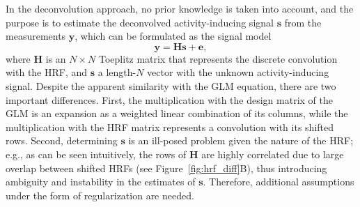 In the deconvolution approach, no prior knowledge is taken into account, and the purpose is to estimate the deconvolved activity-inducing signal $\mathbf{s}$ from the measurements $\mathbf{y}$, which can be formulated as the signal model
\begin{equation}
    \label{eq:deconvolution}
    \mathbf{y} = \mathbf{Hs} + \mathbf{e},
\end{equation}
where $\mathbf{H}$ is an $N\times N$ Toeplitz matrix that represents the discrete convolution with the HRF, and $\mathbf{s}$ a length-$N$ vector with the unknown activity-inducing signal. Despite the apparent similarity with the GLM equation, there are two important differences. First, the multiplication with the design matrix of the GLM is an expansion as a weighted linear combination of its columns, while the multiplication with the HRF matrix represents a convolution with its shifted rows. Second, determining $\mathbf{s}$ is an ill-posed problem given the nature of the HRF; e.g., as can be seen intuitively, the rows of $\mathbf{H}$ are highly correlated due to large overlap between shifted HRFs (see Figure~\ref{fig:hrf_diff}B), thus introducing ambiguity and instability in the estimates of $\mathbf{s}$. Therefore, additional assumptions under the form of regularization are needed. 


